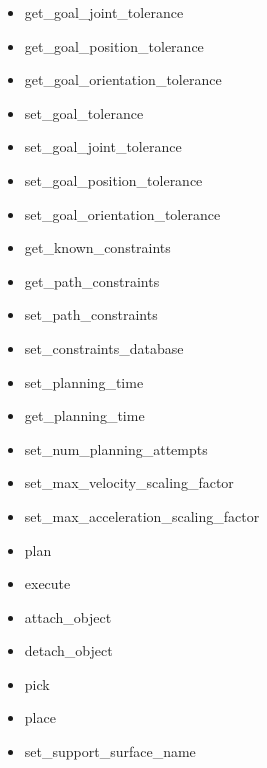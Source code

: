 \documentclass[12pt,spanish,chapterprefix, numbers=noenddot]{book}
\numberwithin{equation}{section}
\numberwithin{figure}{section}
\begin{document}
\begin{itemize}
\item get\_goal\_joint\_tolerance
\item get\_goal\_position\_tolerance
\item get\_goal\_orientation\_tolerance
\item set\_goal\_tolerance
\item set\_goal\_joint\_tolerance
\item set\_goal\_position\_tolerance
\item set\_goal\_orientation\_tolerance
\item get\_known\_constraints
\item get\_path\_constraints
\item set\_path\_constraints
\item set\_constraints\_database
\item set\_planning\_time
\item get\_planning\_time
\item set\_num\_planning\_attempts
\item set\_max\_velocity\_scaling\_factor
\item set\_max\_acceleration\_scaling\_factor
\item plan
\item execute
\item attach\_object
\item detach\_object
\item pick
\item place
\item set\_support\_surface\_name
\end{itemize}
\end{document}
